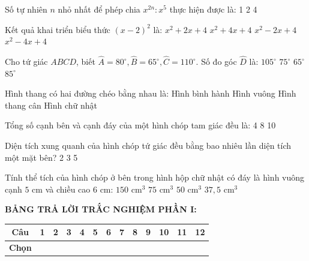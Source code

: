 \documentclass[12pt,a4paper]{article}
\begin{document}
\begin{ex}
Số tự nhiên $n$ nhỏ nhất để phép chia $x^{2n} : x^5$ thực hiện được là:
\choice
{1}
{2}
{}
{4}
\end{ex}

\begin{ex}
Kết quả khai triển biểu thức $(x - 2)^2$ là:
\choice
{$x^2 + 2x + 4$}
{$x^2 + 4x + 4$}
{$x^2 - 2x + 4$}
{\True $x^2 - 4x + 4$}
\end{ex}

\begin{ex}
Cho tứ giác $ABCD$, biết $\widehat{A} = 80^\circ, \widehat{B} = 65^\circ, \widehat{C} = 110^\circ$. Số đo góc $\widehat{D}$ là:
\choice
{\True $105^\circ$}
{$75^\circ$}
{$65^\circ$}
{$85^\circ$}
\end{ex}

\begin{ex}
Hình thang có hai đường chéo bằng nhau là:
\choice
{Hình bình hành}
{Hình vuông}
{\True Hình thang cân}
{Hình chữ nhật}
\end{ex}

\begin{ex}
Tổng số cạnh bên và cạnh đáy của một hình chóp tam giác đều là:
\choice
{4}
{}
{8}
{10}
\end{ex}

\begin{ex}
Diện tích xung quanh của hình chóp tứ giác đều bằng bao nhiêu lần diện tích một mặt bên?
\choice
{2}
{3}
{}
{5}
\end{ex}

\begin{ex}
Tính thể tích của hình chóp ở bên trong hình hộp chữ nhật có đáy là hình vuông cạnh $5\text{ cm}$ và chiều cao $6\text{ cm}$:
\choice
{$150\text{ cm}^3$}
{$75\text{ cm}^3$}
{\True $50\text{ cm}^3$}
{$37{,}5\text{ cm}^3$}
\end{ex}


\vspace{1mm}
\noindent\textbf{BẢNG TRẢ LỜI TRẮC NGHIỆM PHẦN I:}
\begin{center}
\begin{tabular}{|c|c|c|c|c|c|c|c|c|c|c|c|c|}
\hline
\textbf{Câu} & \textbf{1} & \textbf{2} & \textbf{3} & \textbf{4} & \textbf{5} & \textbf{6} & \textbf{7} & \textbf{8} & \textbf{9} & \textbf{10} & \textbf{11} & \textbf{12} \\
\hline
\textbf{Chọn} & \rule{0pt}{0.65cm} & & & & & & & & & & & \\
\hline
\end{tabular}
\end{center}
\vspace{2mm}
\end{document}
